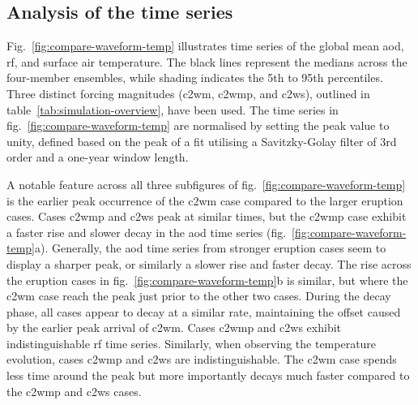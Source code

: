 \documentclass{ametsocV6.1}
\begin{document}

\subsection{Analysis of the time series}

Fig.~\ref{fig:compare-waveform-temp} illustrates time series of the global mean
\gls{aod}, \gls{rf}, and surface air temperature. The black lines represent the medians
across the four-member ensembles, while shading indicates the 5th to 95th percentiles.
Three distinct forcing magnitudes (\gls{c2wm}, \gls{c2wmp}, and \gls{c2ws}), outlined in
table~\ref{tab:simulation-overview}, have been used. The time series in
fig.~\ref{fig:compare-waveform-temp} are normalised by setting the peak value to unity,
defined based on the peak of a fit utilising a Savitzky-Golay filter of 3rd order and a
one-year window length.

A notable feature across all three subfigures of fig.~\ref{fig:compare-waveform-temp} is
the earlier peak occurrence of the \gls{c2wm} case compared to the larger eruption
cases. Cases \gls{c2wmp} and \gls{c2ws} peak at similar times, but the \gls{c2wmp} case
exhibit a faster rise and slower decay in the \gls{aod} time series
(fig.~\ref{fig:compare-waveform-temp}a). Generally, the \gls{aod} time series from
stronger eruption cases seem to display a sharper peak, or similarly a slower rise and
faster decay. The rise across the eruption cases in
fig.~\ref{fig:compare-waveform-temp}b is similar, but where the \gls{c2wm} case reach
the peak just prior to the other two cases. During the decay phase, all cases appear to
decay at a similar rate, maintaining the offset caused by the earlier peak arrival of
\gls{c2wm}. Cases \gls{c2wmp} and \gls{c2ws} exhibit indistinguishable \gls{rf} time
series. Similarly, when observing the temperature evolution, cases \gls{c2wmp} and
\gls{c2ws} are indistinguishable. The \gls{c2wm} case spends less time around the peak
but more importantly decays much faster compared to the \gls{c2wmp} and \gls{c2ws}
cases.
\end{document}
